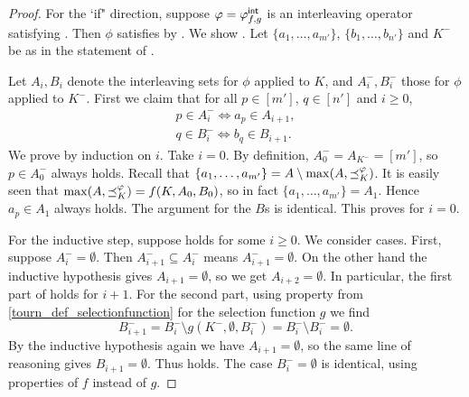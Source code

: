 \begin{proof}
    For the `if" direction, suppose $\varphi = {\varphi_{f, g}^\mathsf{int}}$ is an interleaving
    operator satisfying \smi{}. Then $\phi$ satisfies
    \chaindef{} by . We
    show \rankremoval{}. Let $\{a_1, \ldots, a_{m'}\}$, $\{b_1,
    \ldots, b_{n'}\}$ and $K^-$ be as in the statement of
    \rankremoval{}.

    Let $A_i, B_i$ denote the interleaving sets for $\phi$ applied to $K$, and
    $A^-_i, B^-_i$ those for $\phi$ applied to $K^-$. First we claim that for
    all $p \in [m']$, $q \in [n']$ and $i \ge 0$,
    \begin{equation}
        \label{tourn_eqn_smi_rr_induction}
        \begin{split}
            p \in A^-_i \iff a_p \in A_{i + 1}, \\
            q \in B^-_i \iff b_q \in B_{i + 1}.
        \end{split}
    \end{equation}
    We prove  by induction on $i$. Take
    $i = 0$. By definition, $A^-_0 = A_{K^-} = [m']$, so $p \in A^-_0$ always
    holds. Recall that $\{a_1, \ldots, a_{m'}\} = A \setminus \max(A,
    {\preceq_K^\varphi})$. It is easily seen that $\max(A, {\preceq_K^\varphi}) = f(K, A_0,
    B_0)$, so in fact $\{a_1, \ldots, a_{m'}\} = A_1$. Hence $a_p \in A_1$
    always holds. The argument for the $B$s is identical. This proves
     for $i = 0$.

    For the inductive step, suppose 
    holds for some $i \ge 0$. We consider cases. First, suppose $A^-_i =
    \emptyset$. Then $A^-_{i + 1} \subseteq A^-_i$ means $A^-_{i + 1} =
    \emptyset$. On the other hand the inductive hypothesis gives $A_{i + 1} =
    \emptyset$, so we get $A_{i + 2} = \emptyset$. In particular, the first
    part of  holds for $i + 1$. For the
    second part, using property  from
    \cref{tourn_def_selectionfunction} for the selection function $g$ we find
    \[
        B^-_{i + 1}
        = B^-_i \setminus g(K^-, \emptyset, B^-_i)
        = B^-_i \setminus B^-_i
        = \emptyset.
    \]
    By the inductive hypothesis again we have $A_{i + 1} = \emptyset$, so the
    same line of reasoning gives $B_{i + 1} = \emptyset$. Thus
     holds. The case $B^-_i = \emptyset$
    is identical, using properties of $f$ instead of $g$.


\end{proof}
